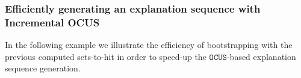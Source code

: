 \documentclass[a4paper,UKenglish,cleveref, autoref, thm-restate, pdfa]{lipics-v2021}
\newcommand\m[1]{\mathcal{#1}}
\renewcommand\comment[1]{}
\newcommand{\tias}[1]{{\comment{\color{blue}Tias:#1}}}
\newcommand\setstohit{\ensuremath{\m{H} }\xspace}
\newcommand\mm[1]{\ensuremath{#1}\xspace}
\newcommand\call[1]{\mm{\texttt{#1}}}
\newcommand\omus{\mm{\call{OUS}}}
\newcommand\comus{\mm{\call{OCUS}}}
\newcommand\ousb{\mm{\call{OCUS\_Bounded}}}
\begin{document}
	
	
	\subsubsection{Efficiently generating an explanation sequence with Incremental OCUS} \label{sec:ocus-incr}
	In the following example we illustrate the efficiency of bootstrapping with the previous computed sets-to-hit in order to speed-up 
	the \comus-based explanation sequence generation.
	
\end{document}
